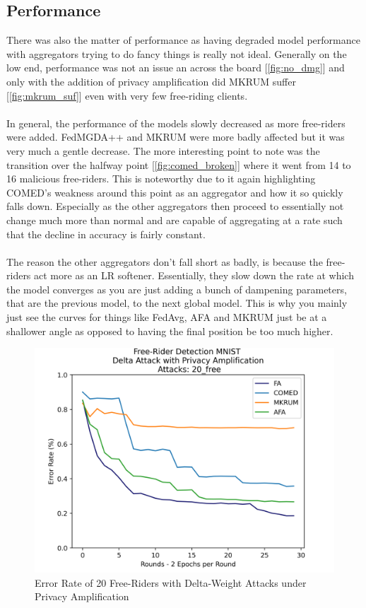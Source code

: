 \subsection{Performance}
There was also the matter of performance as having degraded model performance with aggregators trying to do fancy things is really not ideal.
Generally on the low end, performance was not an issue an across the board [\ref{fig:no_dmg}] and only with the addition of privacy amplification did MKRUM suffer [\ref{fig:mkrum_suf}] even with very few free-riding clients.
\\ \\
In general, the performance of the models slowly decreased as more free-riders were added.
FedMGDA++ and MKRUM were more badly affected but it was very much a gentle decrease.
The more interesting point to note was the transition over the halfway point [\ref{fig:comed_broken}] where it went from 14 to 16 malicious free-riders.
This is noteworthy due to it again highlighting COMED's weakness around this point as an aggregator and how it so quickly falls down.
Especially as the other aggregators then proceed to essentially not change much more than normal and are capable of aggregating at a rate such that the decline in accuracy is fairly constant.
\\ \\
The reason the other aggregators don't fall short as badly, is because the free-riders act more as an LR softener.
Essentially, they slow down the rate at which the model converges as you are just adding a bunch of dampening parameters, that are the previous model, to the next global model.
This is why you mainly just see the curves for things like FedAvg, AFA and MKRUM just be at a shallower angle as opposed to having the final position be too much higher.
\begin{figure}[htbp]
	\centering
    \includegraphics[scale=0.5]{free_riders/graphs/priv20.png}
	\caption{Error Rate of 20 Free-Riders with Delta-Weight Attacks under Privacy Amplification}
	\label{fig:priv20}
\end{figure}
